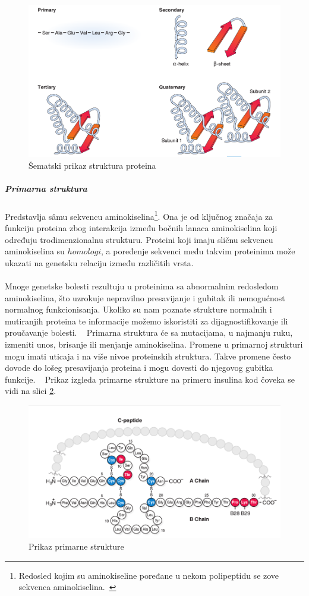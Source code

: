 \documentclass[a4paper]{article}
\begin{document}
\begin{figure}[h]
	\centering
    \includegraphics[width=1\textwidth]{Pictures/structure_schema.png}
    \caption{Šematski prikaz struktura proteina~\cite{bmbg}}
    \label{fig:structures2}
\end{figure}
\subparagraph{Primarna struktura}
Predstavlja s\^amu sekvencu aminokiselina\footnote{Redosled kojim su aminokiseline poređane u nekom polipeptidu se zove sekvenca aminokiselina.~\cite{spasic}}. Ona je od ključnog značaja za funkciju proteina zbog interakcija između bočnih lanaca aminokiselina koji određuju trodimenzionalnu strukturu. Proteini koji imaju sličnu sekvencu aminokiselina su $homologi$, a poređenje sekvenci među takvim proteinima može ukazati na genetsku relaciju između različitih vrsta.\\\\
Mnoge genetske bolesti rezultuju u proteinima sa abnormalnim redosledom aminokiselina, što uzrokuje nepravilno presavijanje i gubitak ili nemogućnost normalnog funkcionisanja. Ukoliko su nam poznate strukture normalnih i mutiranjih proteina te informacije možemo iskoristiti za dijagnostifikovanje ili proučavanje bolesti. ~\cite{lippincott} Primarna struktura će sa mutacijama, u najmanju ruku, izmeniti unos, brisanje ili menjanje aminokiselina. Promene u primarnoj strukturi mogu imati uticaja i na više nivoe proteinskih struktura. Takve promene često dovode do lošeg presavijanja proteina i mogu dovesti do njegovog gubitka funkcije. ~\cite{flash}
Prikaz izgleda primarne strukture na primeru insulina kod čoveka se vidi na slici \ref{fig:insulin}.
\begin{figure}[h]
	\centering
    \includegraphics[width=1\textwidth]{Pictures/insulin.png}
    \caption{Prikaz primarne strukture~\cite{bmbg}}
    \label{fig:insulin}
\end{figure}
\end{document}
